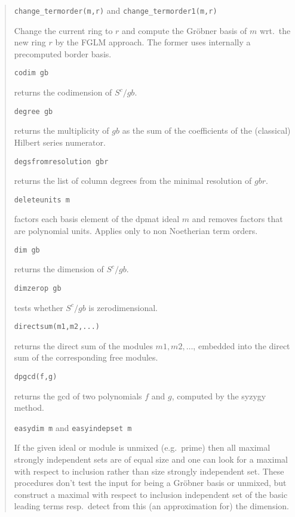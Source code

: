 \documentclass[a4paper,11pt]{article}
\newcommand{\gr}{Gr\"obner}
\newcommand{\pbx}[1]{\mbox{}\hfill \parbox[t]{12cm}{#1} \pagebreak[3]}
\begin{document}
\begin{quote}
\verb|change_termorder(m,r)| and \verb|change_termorder1(m,r)| 

\pbx{Change the current ring to $r$ and compute the {\gr} basis of $m$
wrt.\ the new ring $r$ by the FGLM approach. The former uses
internally a precomputed border basis.} 

\verb|codim gb| 

\pbx{returns the codimension of $S^c/gb$.}

\verb|degree gb| 

\pbx{returns the multiplicity of $gb$ as the sum of the coefficients
of the (classical) Hilbert series numerator.}

\verb|degsfromresolution gbr| 

\pbx{returns the list of column degrees from the minimal resolution
of $gbr$.}

\verb|deleteunits m| 

\pbx{factors each basis element of the dpmat ideal $m$ and removes
factors that are polynomial units. Applies only to non Noetherian
term orders.}

\verb|dim gb| 

\pbx{returns the dimension of $S^c/gb$.}

\verb|dimzerop gb| 

\pbx{tests whether $S^c/gb$ is zerodimensional.}

\verb|directsum(m1,m2,...)| 

\pbx{returns the direct sum of the modules $m1,m2,\ldots$, embedded
into the direct sum of the corresponding free modules.}

\verb|dpgcd(f,g)| 

\pbx{returns the gcd of two polynomials $f$ and $g$, computed by the
syzygy method.}

\verb|easydim m| and \verb|easyindepset m| 

\pbx{ If the given ideal or module is unmixed (e.g.\ prime) then all
maximal strongly independent sets are of equal size and one can look
for a maximal with respect to inclusion rather than size strongly
independent set. These procedures don't test the input for being a
{\gr} basis or unmixed, but construct a maximal with respect to
inclusion independent set of the basic leading terms resp.\ detect
from this (an approximation for) the dimension.}


\end{quote}
\end{document}
